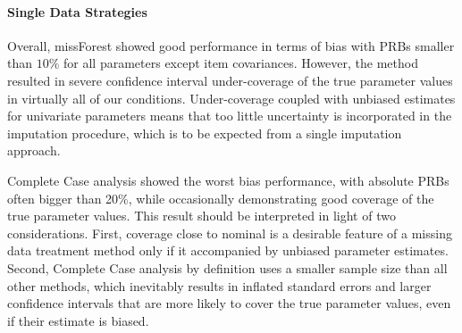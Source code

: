 \paragraph{Single Data Strategies}
	Overall, missForest showed good performance in terms of bias with PRBs smaller than $10\%$ for
	all parameters except item covariances.
	However, the method resulted in severe confidence interval under-coverage of the true parameter values in virtually 
	all of our conditions.
	Under-coverage coupled with unbiased estimates for univariate parameters means that too little uncertainty 
	is incorporated in the imputation procedure, which is to be expected from a single imputation approach.

	Complete Case analysis showed the worst bias performance, with absolute PRBs often bigger than 20\%, 
	while occasionally demonstrating good coverage of the true parameter values.
	This result should be interpreted in light of two considerations.
	First, coverage close to nominal is a desirable feature of a missing data treatment method only if it accompanied by 
	unbiased parameter estimates.
	Second, Complete Case analysis by definition uses a smaller sample size than all other methods,
	which inevitably results in inflated standard errors and larger confidence intervals that are more likely to 
	cover the true parameter values, even if their estimate is biased.


